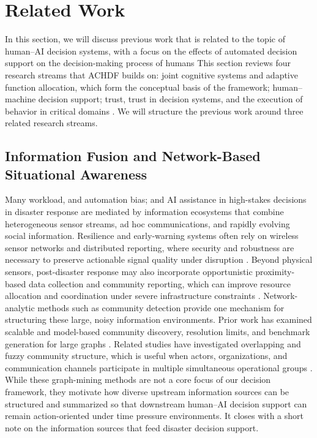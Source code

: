 \documentclass[journal]{IEEEtran}
\theoremstyle{plain}
\theoremstyle{definition}
\providecommand{\DIFaddtex}[1]{{\protect\color{blue} \sf #1}} %
\providecommand{\DIFdeltex}[1]{{\protect\color{red} \scriptsize #1}} %
\providecommand{\DIFaddbegin}{} %
\providecommand{\DIFaddend}{} %
\providecommand{\DIFdelbegin}{} %
\providecommand{\DIFdelend}{} %
\providecommand{\DIFadd}[1]{\texorpdfstring{\DIFaddtex{#1}}{#1}} %
\providecommand{\DIFdel}[1]{\texorpdfstring{\DIFdeltex{#1}}{}} %
\newcommand{\DIFscaledelfig}{0.5}
\newlength{\DIFdelgraphicswidth} %
\newlength{\DIFdelgraphicsheight} %
\newcommand{\DIFaddincludegraphics}[2][]{{\color{blue}\fbox{\DIFOincludegraphics[#1]{#2}}}} %
\newcommand{\DIFdelincludegraphics}[2][]{%
\sbox{\DIFdelgraphicsbox}{\DIFOincludegraphics[#1]{#2}}%
\settoboxwidth{\DIFdelgraphicswidth}{\DIFdelgraphicsbox} %
\settoboxtotalheight{\DIFdelgraphicsheight}{\DIFdelgraphicsbox} %
\scalebox{\DIFscaledelfig}{%
\parbox[b]{\DIFdelgraphicswidth}{\usebox{\DIFdelgraphicsbox}\\[-\baselineskip] \rule{\DIFdelgraphicswidth}{0em}}\llap{\resizebox{\DIFdelgraphicswidth}{\DIFdelgraphicsheight}{%
\setlength{\unitlength}{\DIFdelgraphicswidth}%
\begin{picture}(1,1)%
\thicklines\linethickness{2pt} %
{\color[rgb]{1,0,0}\put(0,0){\framebox(1,1){}}}%
{\color[rgb]{1,0,0}\put(0,0){\line( 1,1){1}}}%
{\color[rgb]{1,0,0}\put(0,1){\line(1,-1){1}}}%
\end{picture}%
}\hspace*{3pt}}} %
} %
\DeclareRobustCommand{\DIFaddbegin}{\DIFOaddbegin \let\includegraphics\DIFaddincludegraphics} %
\DeclareRobustCommand{\DIFaddend}{\DIFOaddend \let\includegraphics\DIFOincludegraphics} %
\DeclareRobustCommand{\DIFdelbegin}{\DIFOdelbegin \let\includegraphics\DIFdelincludegraphics} %
\DeclareRobustCommand{\DIFdelend}{\DIFOaddend \let\includegraphics\DIFOincludegraphics} %
\begin{document}
\section{Related Work}
\DIFdelbegin \DIFdel{In this section, we will discuss previous work that is related to the topic of human--AI decision systems, with a focus on the effects of automated decision support on the decision-making process of humans}\DIFdelend \DIFaddbegin \DIFadd{This section reviews four research streams that ACHDF builds on: joint cognitive systems and adaptive function allocation, which form the conceptual basis of the framework; human--machine decision support; trust}\DIFaddend , \DIFdelbegin \DIFdel{trust in decision systems, and the execution of behavior in critical domains \cite{Bach2024Access,PerezCerrolaza2024CSUR,Yang2022THMSReview,Lai2023FAccT}. We will structure the previous work around three related research streams.
}%

\subsection{\DIFdel{Information Fusion and Network-Based Situational Awareness}}
\addtocounter{subsection}{-1}%
\DIFdel{Many }\DIFdelend \DIFaddbegin \DIFadd{workload, and automation bias; and AI assistance in }\DIFaddend high-stakes \DIFdelbegin \DIFdel{decisions in disaster response are mediated by information ecosystems that combine heterogeneous sensor streams, ad hoc communications, and rapidly evolving social information. Resilience and early-warning systems often rely on wireless sensor networks and distributed reporting, where security and robustness are necessary to preserve actionable signal quality under disruption \cite{Yang2005MobiHoc}.
Beyond physical sensors, post-disaster response may also incorporate opportunistic proximity-based data collection and community reporting, which can improve resource allocation and coordination under severe infrastructure constraints \cite{Longo2025PMC,Stephens2022SIGDOC}. Network-analytic methods such as community detection provide one mechanism for structuring these large, noisy information environments. Prior work has examined scalable and model-based community discovery, resolution limits, and benchmark generation for large graphs \cite{Wakita2007WWW,Prokhorenkova2019WWW,Xian2025WWW,Slota2019SC,Sun2014FSKD,Rezaei2015ASONAM,Akhter2022ICCA}. Related studies have investigated overlapping and fuzzy community structure, which is useful when actors, organizations, and communication channels participate in multiple simultaneous operational groups \cite{Sun2011InformationSciences,Havens2013TFUZZ,Vehlow2013TVCG,Zhang2012KDD,Cao2020ICIIP,Li2022AppliedIntelligence}. While these graph-mining methods are not a core focus of our decision framework, they motivate how diverse upstream information sources can be structured and summarized so that downstream human--AI decision support can remain action-oriented under time pressure \cite{Duan2014KDD}}\DIFdelend \DIFaddbegin \DIFadd{environments. It closes with a short note on the information sources that feed disaster decision support.
}
\end{document}
